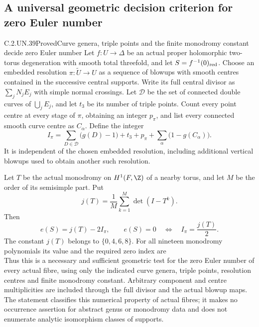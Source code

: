 \subsection{A universal geometric decision criterion for zero Euler number}

\begin{statement}{C.2.UN.39}{Proved}{Curve genera, triple points and the finite monodromy constant decide zero Euler number}
Let $f:U\to\Delta$ be an actual proper holomorphic
two-torus degeneration with smooth total threefold,
and let $S=f^{-1}(0)_{\rm red}$. Choose an embedded
resolution $\pi:\widetilde U\to U$ as a sequence
of blowups with smooth centres contained in the
successive central supports. Write its full
central divisor as $\sum_jN_jE_j$ with simple
normal crossings. Let $\mathcal D$ be the set
of connected double curves of $\bigcup_jE_j$,
and let $t_3$ be its number of triple points.
Count every point centre at every stage of
$\pi$, obtaining an integer $p_\pi$, and list
every connected smooth curve centre as $C_\alpha$.
Define the integer
\[
 I_\pi=
     \sum_{D\in\mathcal D}\bigl(g(D)-1\bigr)+t_3
       +p_\pi+\sum_\alpha\bigl(1-g(C_\alpha)\bigr).
                                                               \tag{C.ZC.1}
\]
It is independent of the chosen embedded
resolution, including additional vertical
blowups used to obtain another such resolution.

Let $T$ be the actual monodromy on $H^1(F,\Z)$
of a nearby torus, and let $M$ be the order of
its semisimple part. Put
\[
             j(T)=\frac1M\sum_{k=1}^{M}\det(I-T^k).
                                                               \tag{C.ZC.2}
\]
Then
\[
                e(S)=j(T)-2I_\pi,\qquad
                e(S)=0\quad\Longleftrightarrow\quad
                         I_\pi=\frac{j(T)}2 .        \tag{C.ZC.3}
\]
The constant $j(T)$ belongs to $\{0,4,6,8\}$.
For all nineteen monodromy polynomials its
value and the required zero index are
\[
 
                                                               \tag{C.ZC.4}
\]
Thus this is a necessary and sufficient
geometric test for the zero Euler number of
every actual fibre, using only the indicated
curve genera, triple points, resolution centres
and finite monodromy constant. Arbitrary
component and centre multiplicities are
included through the full divisor and the
actual blowup maps. The statement classifies
this numerical property of actual fibres;
it makes no occurrence assertion for abstract
genus or monodromy data and does not enumerate
analytic isomorphism classes of supports.
\end{statement}

